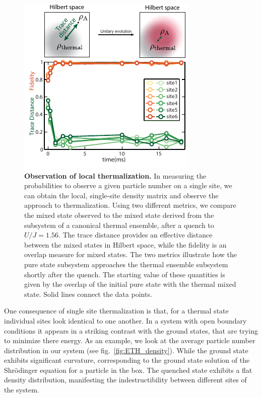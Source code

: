  \begin{figure}[t!]
	\centering
	\includegraphics[scale=1.5]{figures/ETH_fidelity.pdf}
	\caption{{\bf Observation of local thermalization.} In measuring the probabilities to observe a given particle number on a single site, we can obtain the local, single-site density matrix and observe the approach to thermalization. Using two different metrics, we compare the mixed state observed to the mixed state derived from the subsystem of a canonical thermal ensemble, after a quench to $U/J=1.56$. The trace distance provides an effective distance between the mixed states in Hilbert space, while the fidelity is an overlap measure for mixed states. The two metrics illustrate how the pure state subsystem approaches the thermal ensemble subsystem shortly after the quench. The starting value of these quantities is given by the overlap of the initial pure state with the thermal mixed state. Solid lines connect the data points.}
	\label{fig:local}
\end{figure} 

One consequence of single site thermalization is that, for a thermal state individual sites look identical to one another. In a system with open boundary conditions it appears in a striking contrast with the ground states, that are trying to minimize there energy. As an example, we look at the average particle number distribution in our system (see fig.~\ref{fig:ETH_density}). While the ground state exhibits significant curvature, corresponding to the ground state solution of the Shr\"odinger equation for a particle in the box. The quenched state exhibits a flat density distribution, manifesting the indestructibility between different sites of the system.

